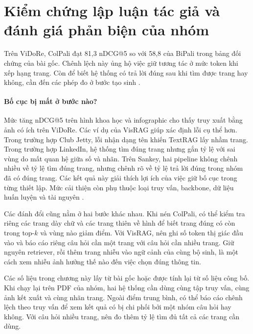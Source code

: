 \section{Kiểm chứng lập luận tác giả và đánh giá phản biện của nhóm}
\label{sec:exp_critique}


Trên ViDoRe, ColPali đạt 81,3 nDCG@5 so với 58,8 của BiPali trong bảng
đối chứng của bài gốc. Chênh lệch này ủng hộ việc giữ tương tác ở mức
token khi xếp hạng trang. Còn để biết hệ thống có trả lời đúng sau khi
tìm được trang hay không, cần đến các phép đo ở bước tạo sinh
\cite{faysse2025colpali,yu2025visrag}.

\paragraph{Bố cục bị mất ở bước nào?}
Mức tăng nDCG@5 trên hình khoa học và infographic cho thấy truy xuất bằng ảnh
có ích trên ViDoRe. Các ví dụ của VisRAG giúp xác định lỗi cụ thể hơn.
Trong trường hợp Club Jetty, lỗi nhận dạng tên khiến TextRAG lấy nhầm
trang. Trong trường hợp LinkedIn, hệ thống tìm đúng trang nhưng gắn tỷ
lệ với sai vùng do mất quan hệ giữa số và nhãn. Trên Sankey, hai pipeline
không chênh nhiều về tỷ lệ tìm đúng trang, nhưng chênh rõ về tỷ lệ trả lời
đúng trong nhóm đã có đúng trang. Các kết quả này giải thích lợi ích của
việc giữ bố cục trong từng thiết lập. Mức cải thiện còn phụ thuộc loại
truy vấn, backbone, dữ liệu huấn luyện và tài nguyên
\cite{faysse2025colpali,yu2025visrag}.

Các đánh đổi cũng nằm ở hai bước khác nhau. Khi nén ColPali, có thể kiểm
tra riêng các trang dày chữ và các trang thiên về hình để biết trang
đúng có còn trong top-$k$ và vùng nào giảm điểm. Với VisRAG, nên ghi số
token thị giác đầu vào và báo cáo riêng câu hỏi cần một trang với câu
hỏi cần nhiều trang. Giữ nguyên retriever, rồi thêm trang nhiễu vào
ngữ cảnh của cùng bộ sinh, là một cách xem nhiễu ảnh hưởng thế nào đến
việc chọn đúng thông tin.

Các số liệu trong chương này lấy từ bài gốc hoặc được tính lại từ số
liệu công bố. Khi chạy lại trên PDF của nhóm, hai hệ thống cần dùng cùng
tập truy vấn, cùng ảnh kết xuất và cùng nhãn trang. Ngoài điểm trung
bình, có thể báo cáo chênh lệch theo truy vấn để xem kết quả có bị chi
phối bởi một nhóm câu hỏi hay không. Với câu hỏi nhiều trang, nên đo
thêm tỷ lệ tìm đủ tất cả các trang cần dùng.

